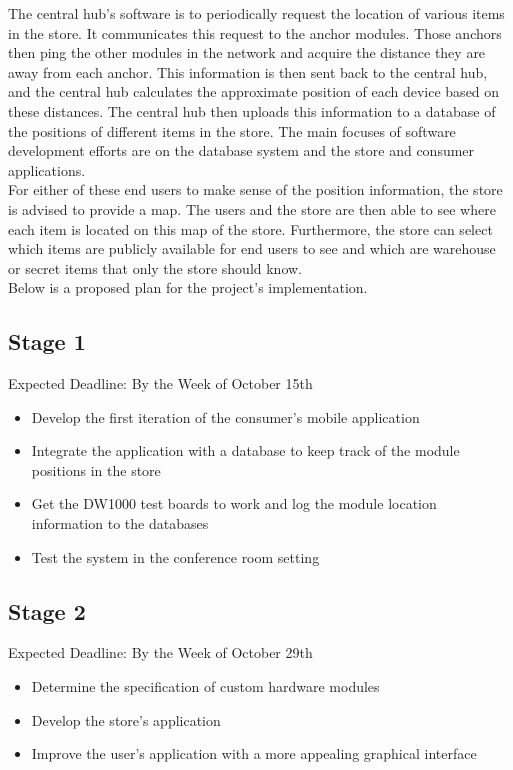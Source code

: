 \documentclass{article}
\begin{document}
The central hub's software is to periodically request the location of various items in the store.
It communicates this request to the anchor modules.
Those anchors then ping the other modules in the network and acquire the distance they are away from each anchor.
This information is then sent back to the central hub, and the central hub calculates the approximate position of each device based on these distances.
The central hub then uploads this information to a database of the positions of different items in the store.
The main focuses of software development efforts are on the database system and the store and consumer applications.\\

For either of these end users to make sense of the position information, the store is advised to provide a map.
The users and the store are then able to see where each item is located on this map of the store.
Furthermore, the store can select which items are publicly available for end users to see and which are warehouse or secret items that only the store should know. \\

Below is a proposed plan for the project's implementation.
\subsection{Stage 1}
Expected Deadline: By the Week of October 15th \\
\begin{itemize}
\item Develop the first iteration of the consumer's mobile application
\item Integrate the application with a database to keep track of the module positions in the store
\item Get the DW1000 test boards to work and log the module location information to the databases
\item Test the system in the conference room setting
\end{itemize}

\subsection{Stage 2}
Expected Deadline: By the Week of October 29th \\
\begin{itemize}
\item Determine the specification of custom hardware modules
\item Develop the store's application
\item Improve the user's application with a more appealing graphical interface
\end{itemize}
\end{document}
